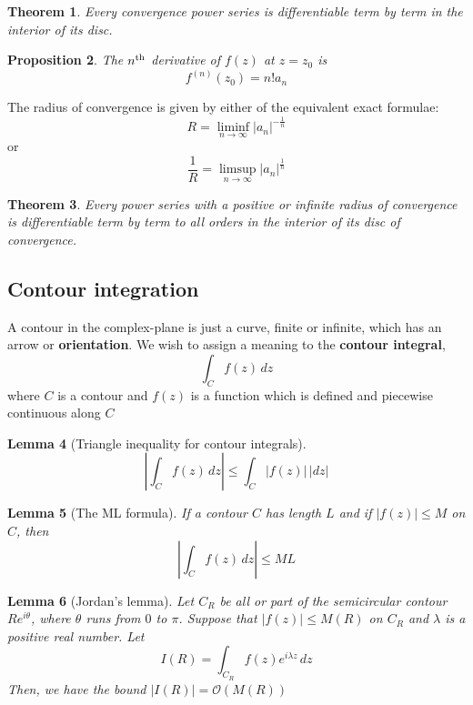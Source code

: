 \documentclass[10pt, oneside, reqno]{amsart}
\theoremstyle{plain}%
\newtheorem{thm}{Theorem}[section]
\newtheorem{lem}[thm]{Lemma}
\newtheorem{prop}[thm]{Proposition}
\theoremstyle{definition}
\theoremstyle{remark}
\newcommand{\dzz}{\, dz}
\newcommand{\bigo}[1]{\mathcal{O}(#1)}
\newcommand{\nth}{n\textsuperscript{th}}
\begin{document}
\begin{thm}
	Every convergence power series is differentiable term by term in the interior of its disc.
\end{thm}

\begin{prop}
	The $\nth$ derivative of $f(z)$ at $z = z_0$ is \[
		f^{(n)}(z_0)  =n! a_n
	\]
\end{prop}

The radius of convergence is given by either of the equivalent exact formulae:\[
	R = \liminf_{n \rightarrow \infty} |a_n|^{-\frac{1}{n}} 
\]
or \[
	\frac{1}{R} = \limsup_{n \rightarrow \infty} |a_n|^{\frac{1}{n}} 
\]

\begin{thm}
	Every power series with a positive or infinite radius of convergence is differentiable term by term to all orders in the interior of its disc of convergence.
\end{thm}



\subsection{Contour integration} %
\label{sec:contour_integration}

A contour in the complex-plane is just a curve, finite or infinite, which has an arrow or \textbf{orientation}.  We wish to assign a meaning to the \textbf{contour integral},\[
	\int_C f(z) \dzz
\]
where $C$ is a contour and $f(z)$ is a function which is defined and piecewise continuous along  $C$

\begin{lem}[Triangle inequality for contour integrals]
	\[
	\left| \int_C f(z) \dzz \right| \leq \int_C |f(z)| \, |dz|	
	\]
\end{lem}


\begin{lem}[The ML formula]
	If a contour $C$ has length $L$ and if $|f(z)| \leq M$ on $C$, then \[
		\left| \int_C f(z) \dzz \right| \leq ML
	\]
\end{lem}

\begin{lem}[Jordan's lemma]
	Let $C_R$ be all or part of the semicircular contour $Re^{i \theta}$, where $\theta$ runs from $0$ to $\pi$. Suppose that $|f(z)| \leq M(R)$ on $C_R$ and $\lambda$ is a positive real number.  Let \[
		I(R) = \int_{C_R} f(z) e^{i \lambda z} \dzz
	\]
	Then, we have the bound $|I(R)| = \bigo{M(R)}$
\end{lem}
\end{document}
